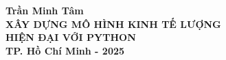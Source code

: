 \begin{titlepage}
  \thispagestyle{empty} %
  \begin{center}
      \vspace*{1cm} %
      {\fontsize{13pt}{15pt} \selectfont \textbf{Trần Minh Tâm}} \\[8cm]
      {\LARGE \textbf{XÂY DỰNG MÔ HÌNH KINH TẾ LƯỢNG}} \\[0.5cm]
      {\LARGE \textbf{HIỆN ĐẠI VỚI PYTHON}} \\[10cm]
      {\fontsize{13pt}{15pt} \selectfont \textbf{TP. Hồ Chí Minh - 2025}}
  \end{center}
\end{titlepage}

\clearpage
\thispagestyle{empty}
\setcounter{page}{1} %
